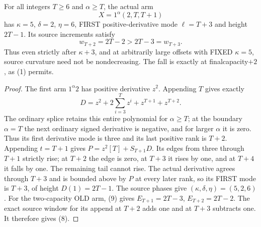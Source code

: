 \begin{proposition}
For all integers $T\ge6$ and $\alpha\ge T$, the actual arm
\[
                              X=1^\alpha(2,T,T+1)
\]
has $\kappa=5$, $\delta=2$, $\eta=6$, FIRST positive-derivative mode
$\ell=T+3$ and height $2T-1$. Its source increments satisfy
\[
                    w_{T+2}=2T-2>2T-3=w_{T+3}.         \tag{8}
\]
Thus even strictly after $\kappa+3$, and at arbitrarily large offsets
with FIXED $\kappa=5$, source curvature need not be nondecreasing.
The fall is exactly at finalcapacity$+2$, as (1) permits.
\end{proposition}
\begin{proof}
The first arm $1^\alpha2$ has positive derivative $z^2$.
Appending $T$ gives exactly
\[
             D=z^2+2\sum_{i=3}^{T}z^i+z^{T+1}+z^{T+2}. \tag{9}
\]
The ordinary splice retains this entire polynomial for $\alpha\ge T$;
at the boundary $\alpha=T$ the next ordinary signed derivative is
negative, and for larger $\alpha$ it is zero. Thus its first derivative
mode is three and its last positive rank is $T+2$.
Appending $t=T+1$ gives $P=z^2[T]+S_{T+1}D$.
Its edges from three through $T+1$ strictly rise; at $T+2$ the edge
is zero, at $T+3$ it rises by one, and at $T+4$ it falls by one.
The remaining tail cannot rise. The actual derivative agrees through
$T+3$ and is bounded above by $P$ at every later rank, so its FIRST
mode is $T+3$, of height $D(1)=2T-1$.
The source phases give $(\kappa,\delta,\eta)=(5,2,6)$.
For the two-capacity OLD arm, (9) gives
$E_{T+1}=2T-3$, $E_{T+2}=2T-2$.
The exact source window for its append at $T+2$ adds one and at
$T+3$ subtracts one. It therefore gives (8).
\end{proof}


